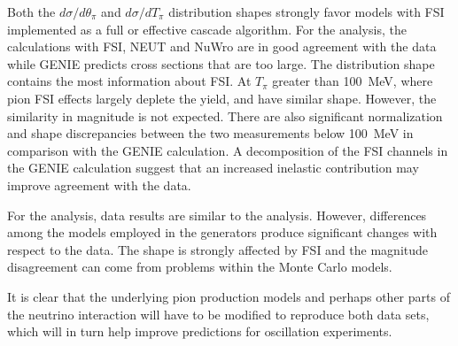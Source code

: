 Both the $d\sigma/d\theta_\pi$ and $d\sigma/dT_\pi$ distribution
shapes strongly favor models with FSI implemented as a full or effective cascade algorithm. 
For the \cconepi 
analysis, the calculations with FSI, NEUT and NuWro are in good 
agreement with the data while GENIE predicts cross sections
that are too large.  The distribution shape contains the most information
about FSI.  At $T_\pi$ greater than 100~MeV, 
where pion FSI effects largely deplete the yield, 
\minerva and \miniboone have similar shape.  However, the similarity
in magnitude is not expected.  There are also 
significant normalization and shape discrepancies between the two 
measurements below 100~MeV in comparison with the GENIE calculation.
A decomposition of the FSI channels in the GENIE calculation suggest 
that an increased inelastic contribution may improve agreement with the data.

For the \ccpi analysis, data results are similar to the \cconepi analysis.
However, differences among the models employed in the generators
produce significant changes with respect to the data.
The shape is strongly affected by FSI and the magnitude
disagreement can come from problems within the Monte Carlo models.

It is clear that the underlying pion production models and perhaps
other parts of the neutrino interaction will have to be 
modified to reproduce both data sets, which will in turn help improve 
predictions for oscillation experiments.


